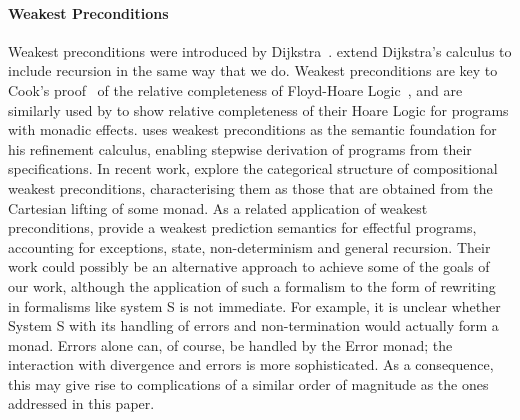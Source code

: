 \paragraph*{Weakest Preconditions}
Weakest preconditions were introduced by Dijkstra~\citep{DBLP:journals/cacm/Dijkstra75}. \citet{DBLP:conf/rex/BonsangueK92} extend Dijkstra's calculus to include recursion in the same way that we do. Weakest preconditions are key to Cook's proof~\citep{DBLP:journals/siamcomp/Cook78} of the relative completeness of Floyd-Hoare Logic~\citep{Floyd1967,DBLP:journals/cacm/Hoare69}, and are similarly used by \citet{DBLP:conf/lics/GoncharovS13} to show relative completeness of their Hoare Logic for programs with monadic effects. \citet{DBLP:books/daglib/0073499} uses weakest preconditions as the semantic foundation for his refinement calculus, enabling stepwise derivation of programs from their specifications. In recent work, \citet{DBLP:journals/mscs/AguirreKK22} explore the categorical structure of compositional weakest preconditions, characterising them as those that are obtained from the Cartesian lifting of some monad.
As a related application of weakest preconditions, \citet{10.1145/3341707} provide a weakest prediction semantics for effectful programs, accounting for exceptions, state, non-determinism and general recursion. Their work could possibly be an alternative approach to achieve some of the goals of our work, although the application of such a formalism to the form of rewriting in formalisms like system S is not immediate. For example, it is unclear whether System S with its handling of errors and non-termination would actually form a monad. Errors alone can, of course, be handled by the Error monad; the interaction with divergence and errors is more sophisticated. As a consequence, this may give rise to complications of a similar order of magnitude as the ones addressed in this paper.

